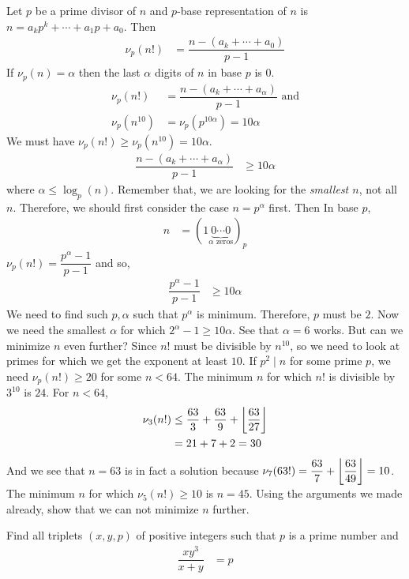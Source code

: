 \begin{solution}
	Let $p$ be a prime divisor of $n$ and $p$-base representation of $n$ is $n=a_kp^k+\cdots+a_1p+a_0$. Then
		\begin{align*}
			\nu_p(n!) & = \dfrac{n-(a_k+\cdots+a_0)}{p-1}
		\end{align*}
	If $\nu_p(n)=\alpha $ then the last $\alpha $ digits of $n$ in base $p$ is $0$.
		\begin{align*}
			\nu_p(n!) & = \dfrac{n-(a_k+\cdots+a_{\alpha })}{p-1}\text { and}\\
			\nu_p(n^{10}) & = \nu_p(p^{10\alpha })=10\alpha
		\end{align*}
	We must have $\nu_p(n!)\geq \nu_p(n^{10})=10\alpha$.
		\begin{align*}
			\dfrac{n-(a_k+\cdots+a_\alpha)}{p-1} & \geq10\alpha
		\end{align*}
	where $\alpha\leq\log_p(n)$. Remember that, we are looking for the \textit{smallest $n$}, not all $n$. Therefore, we should first consider the case $n=p^\alpha$ first. Then In base $p$,
		\begin{align*}
			n & = (1\underbrace{0\cdots0}_{\alpha\text { zeros}})_p
		\end{align*}
	$\nu_p(n!) = \dfrac{p^\alpha-1}{p-1}$ and so,
		\begin{align*}
			\dfrac{p^\alpha-1}{p-1} &\geq10\alpha
		\end{align*}
	We need to find such $p,\alpha$ such that $p^\alpha$ is minimum. Therefore, $p$ must be $2$. Now we need the smallest $\alpha$ for which $2^\alpha-1\geq10\alpha $. See that $\alpha = 6$ works. But can we minimize $n$ even further? Since $n!$ must be divisible by $n^{10}$, so we need to look at primes for which we get the exponent at least $10$. If $p^2\mid n$ for some prime $p$, we need $\nu_p(n!)\geq20$ for some $n<64$. The minimum $n$ for which $n!$ is divisible by $3^{10}$ is $24$. For $n<64$,
		\begin{align*}
			\nu_3(n!) & \leq \dfrac{63}{3}+\dfrac{63}{9}+\left\lfloor{\dfrac{63}{27}}\right\rfloor\\
			  & = 21+7+2=30
		\end{align*}
	And we see that $n=63$ is in fact a solution because $\nu_7(63!) = \dfrac{63}{7}+\left\lfloor{\dfrac{63}{49}}\right\rfloor=10$. The minimum $n$ for which $\nu_5(n!)\geq10$ is $n=45$. Using the arguments we made already, show that we can not minimize $n$ further.
\end{solution}

\begin{problem}
	Find all triplets $(x, y, p)$ of positive integers such that $p$ is a prime number and
		\begin{align*}
			\dfrac{xy^3}{x+y} & = p
		\end{align*}
\end{problem}


